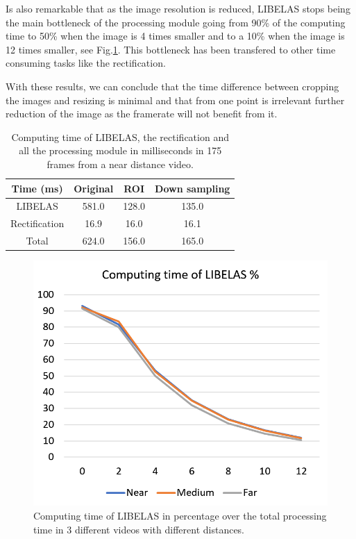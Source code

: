 \documentclass[10pt,a4paper,twocolumn,twoside]{article}
\begin{document}
	Is also remarkable that as the image resolution is reduced, LIBELAS stops being the main bottleneck of the processing module going from 90\% of the computing time to 50\% when the image is 4 times smaller and to a 10\% when the image is 12 times smaller, see Fig.\ref{fig:libelaspercentatge}. This bottleneck has been transfered to other time consuming tasks like the rectification.
	
	With these results, we can conclude that the time difference between cropping the images and resizing is minimal and that from one point is irrelevant further reduction of the image as the framerate will not benefit from it.  
	
	\begin{table}
		\centering
		\begin{tabular}{@{}cccc@{}}
			\toprule
			Time (ms) & Original & ROI & Down sampling \\ \midrule
			LIBELAS   & 581.0      & 128.0 & 135.0           \\
			Rectification   & 16.9     & 16.0  & 16.1          \\
			Total     & 624.0      & 156.0 & 165.0           \\ \bottomrule
		\end{tabular}
		\caption{Computing time of LIBELAS, the rectification and all the processing module in milliseconds in 175 frames from a near distance video.}
		\label{tab:timeprocess}
	\end{table}
	
	\begin{figure}
		\centering
		\includegraphics[width=1\linewidth]{img/ComputingLibelas.PNG}
		\caption{Computing time of LIBELAS in percentage over the total processing time in 3 different videos with different distances.}
		\label{fig:libelaspercentatge}
	\end{figure}
	
\end{document}
